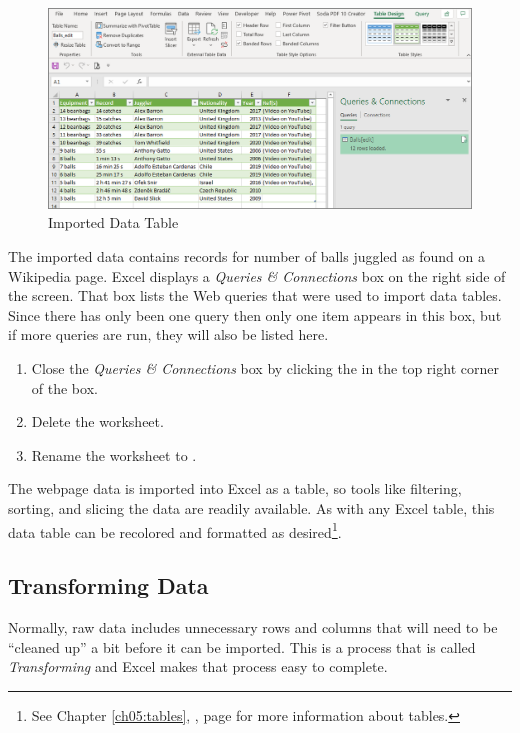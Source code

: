 \begin{figure}[H]
	\centering
	\includegraphics[width=\maxwidth{.95\linewidth}]{gfx/ch07_fig02c}
	\caption{Imported Data Table}
	\label{07:fig02c}
\end{figure}

The imported data contains records for number of balls juggled as found on a Wikipedia page. Excel displays a \textit{Queries \& Connections} box on the right side of the screen. That box lists the Web queries that were used to import data tables. Since there has only been one query then only one item appears in this box, but if more queries are run, they will also be listed here. 

\begin{enumbox}
	\begin{enumerate}
		\item Close the \textit{Queries \& Connections} box by clicking the  in the top right corner of the box.
		\item Delete the  worksheet.
		\item Rename the  worksheet to .
	\end{enumerate}
\end{enumbox}

The webpage data is imported into Excel as a table, so tools like filtering, sorting, and slicing the data are readily available. As with any Excel table, this data table can be recolored and formatted as desired\footnote{See Chapter \ref{ch05:tables}, , page \pageref{ch05:tables} for more information about tables.}.

\subsection{Transforming Data}

Normally, raw data includes unnecessary rows and columns that will need to be ``cleaned up'' a bit before it can be imported. This is a process that is called \textit{Transforming} and Excel makes that process easy to complete. 


